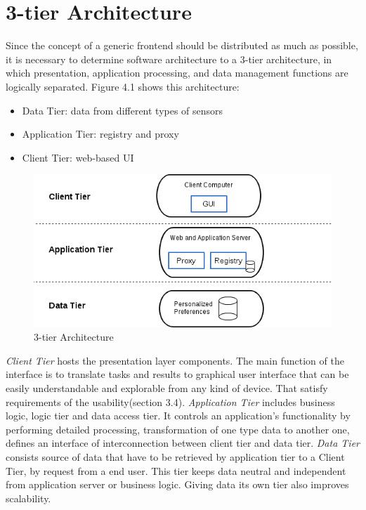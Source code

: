 \section{3-tier Architecture}
Since the concept of a generic frontend should be distributed as much as possible, it is necessary to determine software architecture 
to a 3-tier architecture, in which presentation, application processing, and data management functions are logically separated.
Figure 4.1 shows this architecture:
\begin{itemize}
\item Data Tier: data from different types of sensors
\item Application Tier: registry and proxy
\item Client Tier: web-based UI
\end{itemize} 
\begin{figure}[!ht]
\centering
\includegraphics[scale=0.7]{images/3tier.png}   
\caption[3-tier Architecture]{3-tier Architecture}
\label{img:3-tier Architecture}                           
\end{figure}
\emph{Client Tier} hosts the presentation layer components. The main function of the interface is to translate tasks and results to graphical user interface that can be easily understandable and explorable from any kind of device. That satisfy requirements of the usability(section 3.4).
\newline
\emph{Application Tier} includes business logic, logic tier and data access tier. It controls an application's functionality by performing detailed processing, transformation of one type data to another one, defines an interface of interconnection between client tier and data tier.
\newline
\emph{Data Tier} consists source of data that have to be retrieved by application tier to a Client Tier, by request from a end user. This tier keeps data neutral and independent from application server or business logic. Giving data its own tier also improves scalability. 
